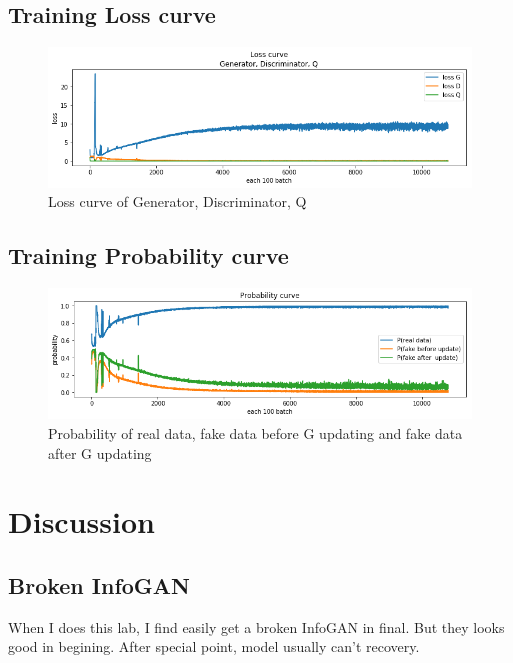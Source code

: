 \documentclass[12pt]{article}
\begin{document}
\subsection{Training Loss curve}

\begin{figure}[H]
\centering
\includegraphics[width=\linewidth]{Images/loss.png}
\caption{Loss curve of Generator, Discriminator, Q}
\end{figure}

\subsection{Training Probability curve}

\begin{figure}[H]
\centering
\includegraphics[width=\linewidth]{Images/prob.png}
\caption{Probability of real data, fake data before G updating and fake data after G updating}
\end{figure}

\newpage

\section{Discussion}

\subsection{Broken InfoGAN}

When I does this lab, I find easily get a broken InfoGAN in final. But they looks good in begining. After special point, model usually can't recovery.
\end{document}
